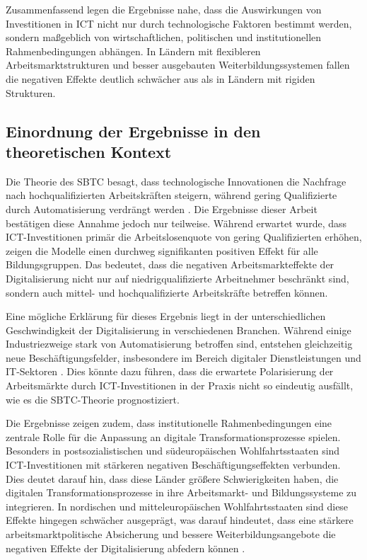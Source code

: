 Zusammenfassend legen die Ergebnisse nahe, dass die Auswirkungen von Investitionen in \ac{ICT}  
nicht nur durch technologische Faktoren bestimmt werden, sondern maßgeblich von 
wirtschaftlichen, politischen und institutionellen Rahmenbedingungen abhängen. In Ländern 
mit flexibleren Arbeitsmarktstrukturen und besser ausgebauten Weiterbildungssystemen fallen 
die negativen Effekte deutlich schwächer aus als in Ländern mit rigiden Strukturen.

\subsection{Einordnung der Ergebnisse in den theoretischen Kontext}

Die Theorie des \ac{SBTC} besagt, dass technologische Innovationen die Nachfrage nach 
hochqualifizierten Arbeitskräften steigern, während gering Qualifizierte durch 
Automatisierung verdrängt werden \parencite[S. 7]{acemoglu2002technical}. Die Ergebnisse 
dieser Arbeit bestätigen diese Annahme jedoch nur teilweise. Während erwartet wurde, dass 
\ac{ICT}-Investitionen primär die Arbeitslosenquote von gering Qualifizierten erhöhen, 
zeigen die Modelle einen durchweg signifikanten positiven Effekt für alle Bildungsgruppen. 
Das bedeutet, dass die negativen Arbeitsmarkteffekte der Digitalisierung nicht nur auf 
niedrigqualifizierte Arbeitnehmer beschränkt sind, sondern auch mittel- und hochqualifizierte 
Arbeitskräfte betreffen können.

Eine mögliche Erklärung für dieses Ergebnis liegt in der unterschiedlichen Geschwindigkeit 
der Digitalisierung in verschiedenen Branchen. Während einige Industriezweige stark von 
Automatisierung betroffen sind, entstehen gleichzeitig neue Beschäftigungsfelder, insbesondere 
im Bereich digitaler Dienstleistungen und IT-Sektoren \parencite[S. 1554-1555]{autor2013thegrowth}. 
Dies könnte dazu führen, dass die erwartete Polarisierung der Arbeitsmärkte durch 
\ac{ICT}-Investitionen in der Praxis nicht so eindeutig ausfällt, wie es die \ac{SBTC}-Theorie 
prognostiziert.

Die Ergebnisse zeigen zudem, dass institutionelle Rahmenbedingungen eine zentrale Rolle 
für die Anpassung an digitale Transformationsprozesse spielen. Besonders in 
postsozialistischen und südeuropäischen Wohlfahrtsstaaten sind \ac{ICT}-Investitionen mit 
stärkeren negativen Beschäftigungseffekten verbunden. Dies deutet darauf hin, dass diese 
Länder größere Schwierigkeiten haben, die digitalen Transformationsprozesse in ihre 
Arbeitsmarkt- und Bildungssysteme zu integrieren. In nordischen und mitteleuropäischen 
Wohlfahrtsstaaten sind diese Effekte hingegen schwächer ausgeprägt, was darauf hindeutet, 
dass eine stärkere arbeitsmarktpolitische Absicherung und bessere Weiterbildungsangebote 
die negativen Effekte der Digitalisierung abfedern können 
\parencite[S. 27-30]{espingandersen1990thethree}.

